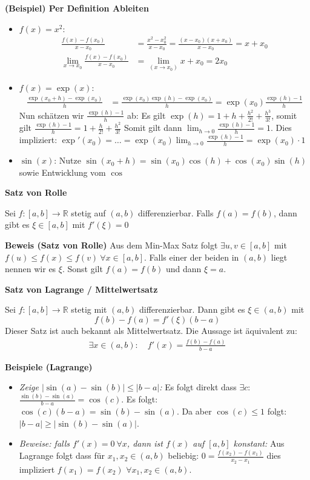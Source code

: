 \documentclass[25pt]{sciposter}
\newcommand{\R}{\mathbb{R}}
\newenvironment{method}[1]{\begin{mdframed}[backgroundcolor=blue!10,innertopmargin=15pt, innerbottommargin=15pt, nobreak=true]
		\textbf{#1 }
	}
	{ 
	\end{mdframed}
}
\begin{document}
\begin{multicols}{3}
\textbf{(Beispiel) Per Definition Ableiten}

\begin{itemize}
	\item $f(x) = x^2$:
	\begin{align*}
		\frac{f(x) - f(x_0)}{x-x_0} &= 	\frac{x^2 - x_{0}^2}{x-x_0} = \frac{(x-x_0) (x+x_0)}{x-x_0} = x + x_0\\
		\lim_{x \to x_0} \frac{f(x)-f(x_0)}{x-x_0} &= \lim_{(x\to x_0)} x + x_0 = 2x_0
	\end{align*}
	
	\item $f(x) = \exp(x)$:
	\begin{align*}
		\frac{\exp(x_0 + h ) - \exp(x_0)}{h} &= \frac{\exp(x_0)\exp(h) -\exp(x_0)}{h} = \exp(x_0) \frac{\exp(h) - 1}{h}
	\end{align*}
	Nun schätzen wir $\frac{\exp(h) - 1}{h}$ ab: Es gilt $\exp(h) = 1 + h + \frac{h^2}{2!} + \frac{h^3}{3!}$, somit gilt 
	$\frac{\exp(h) - 1}{h} = 1 + \frac{h}{2!} + \frac{h^2}{3!}$
	Somit gilt dann $\lim_{h \to 0} \frac{\exp(h) - 1}{h} = 1$. Dies impliziert:
	$\exp'(x_0) = \ldots = \exp(x_0) \lim_{h \to 0} \frac{\exp(h) - 1}{h} = \exp(x_0) \cdot 1$
	\item {\footnotesize $\sin(x)$: Nutze $\sin(x_0 + h ) = \sin(x_0)\cos(h) + \cos(x_0)\sin(h)$ sowie Entwicklung vom $\cos$}
\end{itemize}



\begin{method}{Satz von Rolle}
	Sei $f: [a,b] \to \R$ stetig auf $(a,b)$ differenzierbar. Falls $f(a) = f(b)$, dann gibt es $\xi \in [a,b]$ mit $f'(\xi) = 0$
\end{method}
\textbf{Beweis (Satz von Rolle)} Aus dem Min-Max Satz folgt $\exists u,v \in [a,b]$ mit $f(u) \leq f(x) \leq f(v) \ \forall x \in [a,b]$. Falls einer der beiden in $(a,b)$ liegt nennen wir es $\xi$. Sonst gilt $f(a) = f(b)$ und dann $\xi = a$.


\begin{method}{Satz von Lagrange / Mittelwertsatz}
	Sei $f:[a,b] \to \R$ stetig mit $(a,b)$ differenzierbar. Dann gibt es $\xi \in (a,b)$ mit $$f(b) - f(a) = f'(\xi) (b-a)$$
	Dieser Satz ist auch bekannt als Mittelwertsatz. Die Aussage ist äquivalent zu: 
	\begin{align*}
		\exists x \in (a,b) : \quad f'(x) = \frac{f(b) -f(a) }{b-a}
	\end{align*}
\end{method}
\textbf{Beispiele (Lagrange)}
\begin{itemize}
	\item \textit{Zeige $|\sin(a) - \sin(b)| \leq |b-a|$:} Es folgt direkt dass $\exists c$: $\frac{\sin(b)- \sin(a)}{b-a} = \cos(c)$. Es folgt: $\cos(c) (b-a) = \sin(b) - \sin(a)$. Da aber $\cos(c) \leq 1$ folgt:
	$|b-a| \geq |\sin(b) - \sin(a)|$.
	\item \textit{Beweise: falls $f'(x) = 0 \ \forall x$, dann ist $f(x)$ auf $[a,b]$ konstant:} Aus Lagrange folgt dass für $x_1,x_2\in (a,b)$ beliebig: $0 = \frac{f(x_2)-f(x_1)}{x_2-x_1}$ dies impliziert $f(x_1) = f(x_2)$ $\forall x_1,x_2 \in (a,b)$.
\end{itemize}



\end{multicols}
\end{document}

